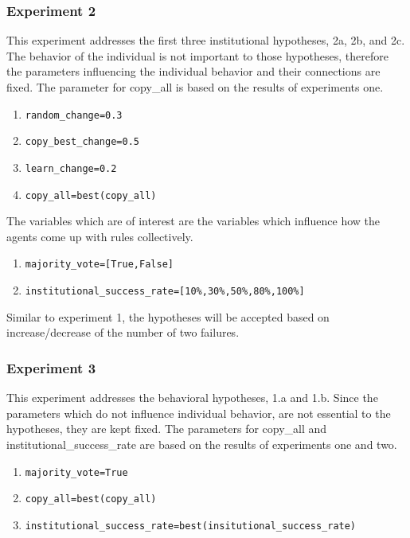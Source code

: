 \documentclass[a4paper]{article}
\begin{document}
\subsubsection{Experiment 2}
This experiment addresses the first three institutional hypotheses, 2a, 2b, and 2c. The behavior of 
the individual is not important to those hypotheses, therefore the parameters influencing the 
individual behavior and their connections are fixed. The parameter for copy\_all is 
based on the results of experiments one.
\begin{enumerate}
 \item \begin{alltt}random_change  = 0.3\end{alltt}
 \item \begin{alltt}copy_best_change = 0.5\end{alltt}
 \item \begin{alltt}learn_change = 0.2\end{alltt}
 \item \begin{alltt}copy_all = best(copy_all)\end{alltt}
\end{enumerate}


The variables which are of interest are the variables which influence how the agents come up with rules collectively. 

\begin{enumerate}
 \item \begin{alltt}majority_vote = [True, False]\end{alltt}
 \item \begin{alltt}institutional_success_rate = [10 \%, 30 \%, 50 \%, 80\% ,100\%] \end{alltt}
\end{enumerate}
Similar to experiment 1, the hypotheses will be accepted based on increase/decrease of the number of two failures.

\subsubsection{Experiment 3}
This experiment addresses the behavioral hypotheses, 1.a and 1.b. Since the parameters which do 
not influence individual behavior, are not essential to the hypotheses, they are kept fixed. 
The parameters for copy\_all and institutional\_success\_rate 
are based on the results of experiments one and two.
\begin{enumerate}
 \item \begin{alltt}majority_vote = True\end{alltt}
 \item \begin{alltt}copy_all = best(copy_all)\end{alltt}
 \item \begin{alltt}institutional_success_rate = best(insitutional_success_rate)\end{alltt}
\end{enumerate}
\end{document}
